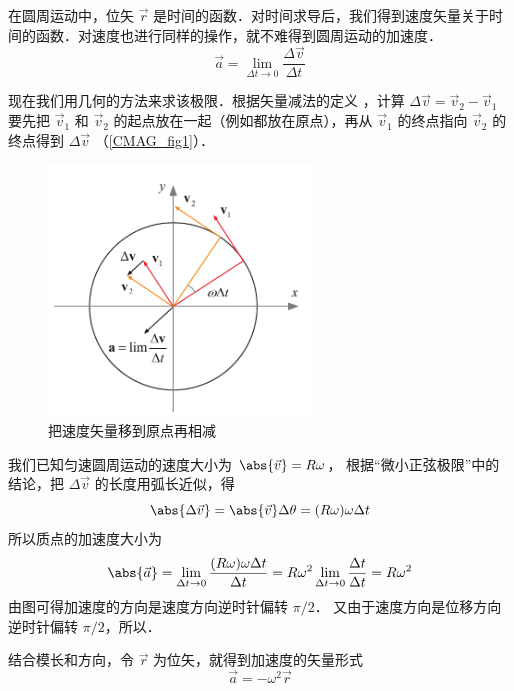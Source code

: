 

在圆周运动中，位矢 $\vec r$ 是时间的函数．对时间求导后，我们得到速度矢量关于时间的函数．对速度也进行同样的操作，就不难得到圆周运动的加速度．
\begin{equation}
\vec a = \lim_{\Delta t \to 0} \frac{\Delta \vec v}{\Delta t}
\end{equation}

现在我们用几何的方法来求该极限．根据矢量减法的定义%
，计算 $\Delta \vec v = \vec v_2 - \vec v_1$ 要先把 $\vec v_1$ 和 $\vec v_2$ 的起点放在一起（例如都放在原点），再从 $\vec v_1$ 的终点指向 $\vec v_2$ 的终点得到 $\Delta \vec v$ （\autoref{CMAG_fig1}）． 

\begin{figure}[ht]
\centering
\includegraphics[width=7cm]{./figures/CMAG1.pdf}
\caption{把速度矢量移到原点再相减}\label{CMAG_fig1}
\end{figure}

我们已知匀速圆周运动的速度大小为 $\abs{\vec v} = R\omega$， 根据“微小正弦极限”中的结论，把 $\Delta\vec v$ 的长度用弧长近似，得
\begin{equation}
\abs{\Delta \vec v} = \abs{\vec v}\Delta \theta  = (R\omega)\omega \Delta t
\end{equation}
所以质点的加速度大小为
\begin{equation}
\abs{\vec a} = \lim_{\Delta t \to 0} \frac{(R\omega)\omega \Delta t}{\Delta t} = R \omega ^2 \lim_{\Delta t \to 0} \frac{\Delta t}{\Delta t} = R \omega ^2
\end{equation}
由图可得加速度的方向是速度方向逆时针偏转 $\pi/2$． 又由于速度方向是位移方向逆时针偏转 $\pi/2$，所以．

结合模长和方向，令 $\vec r$ 为位矢，就得到加速度的矢量形式
\begin{equation}
\vec a =  - \omega ^2 \vec r
\end{equation}


















